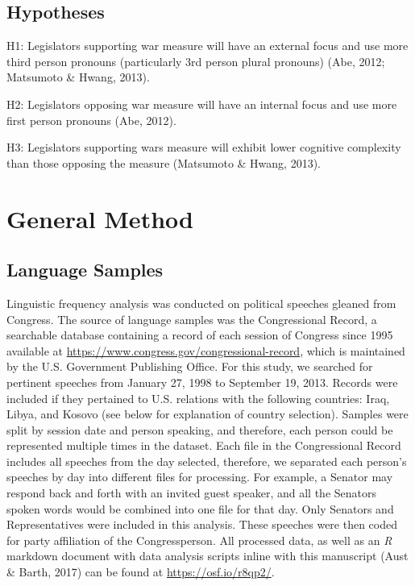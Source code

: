 \documentclass[english,,man]{apa6}
\begin{document}
\hypertarget{hypotheses}{%
\subsection{Hypotheses}\label{hypotheses}}

H1: Legislators supporting war measure will have an external focus and use more third person pronouns (particularly 3rd person plural pronouns) (Abe, 2012; Matsumoto \& Hwang, 2013).

H2: Legislators opposing war measure will have an internal focus and use more first person pronouns (Abe, 2012).

H3: Legislators supporting wars measure will exhibit lower cognitive complexity than those opposing the measure (Matsumoto \& Hwang, 2013).

\hypertarget{general-method}{%
\section{General Method}\label{general-method}}

\hypertarget{language-samples}{%
\subsection{Language Samples}\label{language-samples}}

Linguistic frequency analysis was conducted on political speeches gleaned from Congress. The source of language samples was the Congressional Record, a searchable database containing a record of each session of Congress since 1995 available at \url{https://www.congress.gov/congressional-record}, which is maintained by the U.S. Government Publishing Office. For this study, we searched for pertinent speeches from January 27, 1998 to September 19, 2013. Records were included if they pertained to U.S. relations with the following countries: Iraq, Libya, and Kosovo (see below for explanation of country selection). Samples were split by session date and person speaking, and therefore, each person could be represented multiple times in the dataset. Each file in the Congressional Record includes all speeches from the day selected, therefore, we separated each person's speeches by day into different files for processing. For example, a Senator may respond back and forth with an invited guest speaker, and all the Senators spoken words would be combined into one file for that day. Only Senators and Representatives were included in this analysis. These speeches were then coded for party affiliation of the Congressperson. All processed data, as well as an \emph{R} markdown document with data analysis scripts inline with this manuscript (Aust \& Barth, 2017) can be found at \url{https://osf.io/r8qp2/}.
\end{document}
